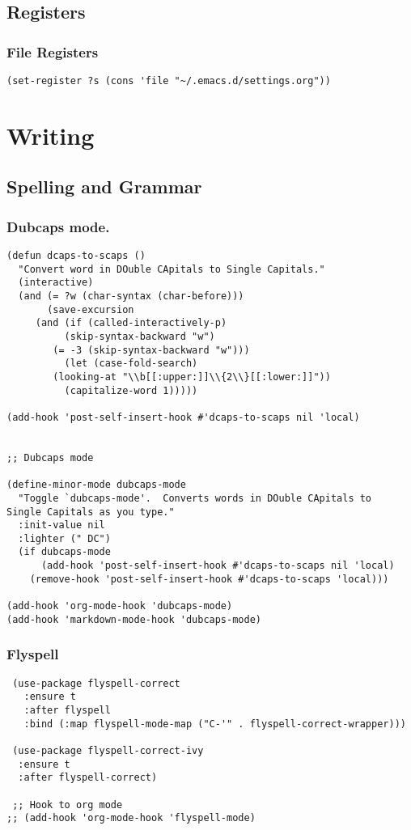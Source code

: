 \documentclass[11pt]{article}
\begin{document}
\subsection{Registers}
\label{sec:org2940d13}
\subsubsection{File Registers}
\label{sec:org49b8e35}
\begin{verbatim}
(set-register ?s (cons 'file "~/.emacs.d/settings.org"))

\end{verbatim}
\section{Writing}
\label{sec:orgb169d24}
\subsection{Spelling and Grammar}
\label{sec:orgd4fed44}
\subsubsection{Dubcaps mode.}
\label{sec:org38db86a}
\begin{verbatim}
(defun dcaps-to-scaps ()
  "Convert word in DOuble CApitals to Single Capitals."
  (interactive)
  (and (= ?w (char-syntax (char-before)))
       (save-excursion
	 (and (if (called-interactively-p)
		  (skip-syntax-backward "w")
		(= -3 (skip-syntax-backward "w")))
	      (let (case-fold-search)
		(looking-at "\\b[[:upper:]]\\{2\\}[[:lower:]]"))
	      (capitalize-word 1)))))

(add-hook 'post-self-insert-hook #'dcaps-to-scaps nil 'local)


;; Dubcaps mode

(define-minor-mode dubcaps-mode
  "Toggle `dubcaps-mode'.  Converts words in DOuble CApitals to
Single Capitals as you type."
  :init-value nil
  :lighter (" DC")
  (if dubcaps-mode
      (add-hook 'post-self-insert-hook #'dcaps-to-scaps nil 'local)
    (remove-hook 'post-self-insert-hook #'dcaps-to-scaps 'local)))

(add-hook 'org-mode-hook 'dubcaps-mode)
(add-hook 'markdown-mode-hook 'dubcaps-mode)

\end{verbatim}
\subsubsection{Flyspell}
\label{sec:orgb20d27a}
\begin{verbatim}
 (use-package flyspell-correct
   :ensure t
   :after flyspell
   :bind (:map flyspell-mode-map ("C-'" . flyspell-correct-wrapper)))

 (use-package flyspell-correct-ivy
  :ensure t 
  :after flyspell-correct)

 ;; Hook to org mode
;; (add-hook 'org-mode-hook 'flyspell-mode)



\end{verbatim}
\end{document}
